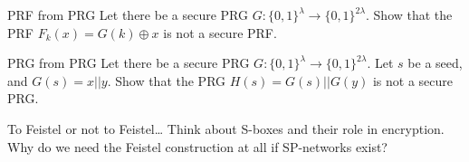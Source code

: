\documentclass{practice}
\begin{document}
\begin{task}{PRF from PRG}
  Let there be a secure PRG $G : \{0, 1\}^\lambda \to \{0, 1\}^{2\lambda}$.
  Show that the PRF $F_k(x) = G(k) \oplus x$ is not a secure PRF.
\end{task}

\newpage

\begin{task}{PRG from PRG}
  Let there be a secure PRG $G : \{0,1\}^\lambda \to \{0,1\}^{2\lambda}$.
  Let $s$ be a seed, and $G(s) = x\vert\vert y$.
  Show that the PRG $H(s)=G(s)\vert\vert G(y)$ is not a secure PRG.
\end{task}

\begin{task}{To Feistel or not to Feistel\dots}
  Think about S-boxes and their role in encryption.
  Why do we need the Feistel construction at all if SP-networks exist?
\end{task}
\end{document}
